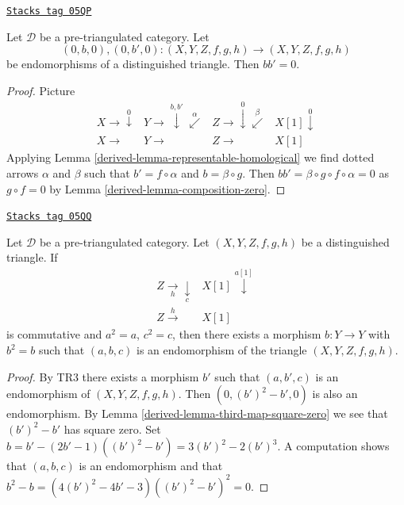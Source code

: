\begin{lemma}
\label{derived-lemma-third-map-square-zero}
\href{https://stacks.math.columbia.edu/tag/05QP}{\texttt{Stacks tag 05QP}}

Let $\mathcal{D}$ be a pre-triangulated category.
Let
$$
(0, b, 0), (0, b', 0) : (X, Y, Z, f, g, h) \to (X, Y, Z, f, g, h)
$$
be endomorphisms of a distinguished triangle. Then $bb' = 0$.
\end{lemma}

\begin{proof}

Picture
$$
\begin{array}{cccc}X \longrightarrow\overset{0}{\downarrow} & Y \longrightarrow\overset{b, b'}{\downarrow}\overset{\alpha}{\swarrow} & Z \longrightarrow\overset{0}{\downarrow}\overset{\beta}{\swarrow} & X[1] \overset{0}{\downarrow} \\ X \longrightarrow & Y \longrightarrow & Z \longrightarrow & X[1]\end{array}
$$
Applying
Lemma \ref{derived-lemma-representable-homological}
we find dotted arrows $\alpha$ and $\beta$ such that
$b' = f \circ \alpha$ and $b = \beta \circ g$. Then
$bb' = \beta \circ g \circ f \circ \alpha = 0$
as $g \circ f = 0$ by
Lemma \ref{derived-lemma-composition-zero}.
\end{proof}

\begin{lemma}
\label{derived-lemma-third-map-idempotent}
\href{https://stacks.math.columbia.edu/tag/05QQ}{\texttt{Stacks tag 05QQ}}

Let $\mathcal{D}$ be a pre-triangulated category.
Let $(X, Y, Z, f, g, h)$ be a distinguished triangle.
If
$$
\begin{array}{cc}Z \underset{h}{\longrightarrow}\underset{c}{\downarrow} & X[1] \overset{a[1]}{\downarrow} \\ Z \overset{h}{\longrightarrow} & X[1]\end{array}
$$
is commutative and $a^2 = a$, $c^2 = c$, then there exists a
morphism $b : Y \to Y$ with $b^2 = b$ such that
$(a, b, c)$ is an endomorphism of the triangle $(X, Y, Z, f, g, h)$.
\end{lemma}

\begin{proof}

By TR3 there exists a morphism $b'$ such that
$(a, b', c)$ is an endomorphism of $(X, Y, Z, f, g, h)$.
Then $(0, (b')^2 - b', 0)$ is also an endomorphism. By
Lemma \ref{derived-lemma-third-map-square-zero}
we see that $(b')^2 - b'$ has square zero.
Set $b = b' - (2b' - 1)((b')^2 - b') = 3(b')^2 - 2(b')^3$.
A computation shows that $(a, b, c)$ is an endomorphism and
that $b^2 - b = (4(b')^2 - 4b' - 3)((b')^2 - b')^2 = 0$.
\end{proof}

